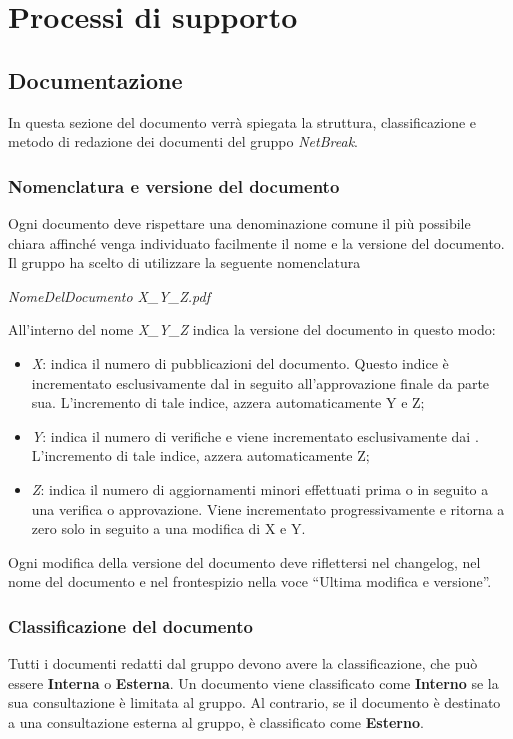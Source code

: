 \newpage

\section{Processi di supporto}
\subsection{Documentazione}
	In questa sezione del documento verrà spiegata la struttura, classificazione e metodo di redazione dei documenti del gruppo \textit{NetBreak}.

	\subsubsection{Nomenclatura e versione del documento}
	Ogni documento deve rispettare una denominazione comune il più possibile chiara affinché venga individuato facilmente il nome e la versione del documento. 
	Il gruppo ha scelto di utilizzare la seguente nomenclatura 
		\begin{center}
			\textit{NomeDelDocumento X\_Y\_Z.pdf}
		\end{center}
	
	All’interno del nome \textit{X\_Y\_Z} indica la versione del documento in questo modo:
	
	\begin{itemize}
	  \item \textit{X}: indica il numero di pubblicazioni del documento. Questo indice è incrementato esclusivamente dal \textit{\RdP} in seguito all’approvazione finale da parte sua. L’incremento di tale indice, azzera automaticamente Y e Z;
	  \item \textit{Y}: indica il numero di verifiche e viene incrementato esclusivamente dai \textit{\Vers}. L’incremento di tale indice, azzera automaticamente Z;
	  \item \textit{Z}: indica il numero di aggiornamenti minori effettuati prima o in seguito a una verifica o approvazione. Viene incrementato progressivamente e ritorna a zero solo in seguito a una modifica di X e Y.
	\end{itemize}
	
	Ogni modifica della versione del documento deve riflettersi nel changelog, nel nome del documento e nel frontespizio nella voce “Ultima modifica e versione”.

	\subsubsection{Classificazione del documento}
	Tutti i documenti redatti dal gruppo devono avere la classificazione, che può essere \textbf{Interna} o \textbf{Esterna}.
	Un documento viene classificato come \textbf{Interno} se la sua consultazione è limitata al gruppo. Al contrario, se il documento è destinato a una consultazione esterna al gruppo, è classificato come \textbf{Esterno}.
	
